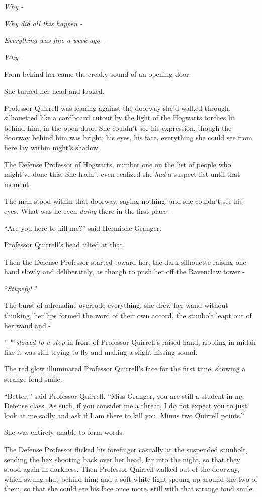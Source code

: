 \emph{Why -}

\emph{Why did all this happen -}

\emph{Everything was fine a week ago -}

\emph{Why -}

From behind her came the creaky sound of an opening door.

She turned her head and looked.

Professor Quirrell was leaning against the doorway she'd walked through,
silhouetted like a cardboard cutout by the light of the Hogwarts torches
lit behind him, in the open door. She couldn't see his expression,
though the doorway behind him was bright; his eyes, his face, everything
she could see from here lay within night's shadow.

The Defense Professor of Hogwarts, number one on the list of people who
might've done this. She hadn't even realized she \emph{had} a suspect
list until that moment.

The man stood within that doorway, saying nothing; and she couldn't see
his eyes. What was he even \emph{doing} there in the first place -

``Are you here to kill me?'' said Hermione Granger.

Professor Quirrell's head tilted at that.

Then the Defense Professor started toward her, the dark silhouette
raising one hand slowly and deliberately, as though to push her off the
Ravenclaw tower -

``\emph{Stupefy!} ''

The burst of adrenaline overrode everything, she drew her wand without
thinking, her lips formed the word of their own accord, the stunbolt
leapt out of her wand and -

"--* \emph{slowed to a stop} in front of Professor Quirrell's raised hand,
rippling in midair like it was still trying to fly and making a slight
hissing sound.

The red glow illuminated Professor Quirrell's face for the first time,
showing a strange fond smile.

``Better,'' said Professor Quirrell. ``Miss Granger, you are still a
student in my Defense class. As such, if you consider me a threat, I do
not expect you to just look at me sadly and ask if I am there to kill
you. Minus two Quirrell points.''

She was entirely unable to form words.

The Defense Professor flicked his forefinger casually at the suspended
stunbolt, sending the hex shooting back over her head, far into the
night, so that they stood again in darkness. Then Professor Quirrell
walked out of the doorway, which swung shut behind him; and a soft white
light sprung up around the two of them, so that she could see his face
once more, still with that strange fond smile.

